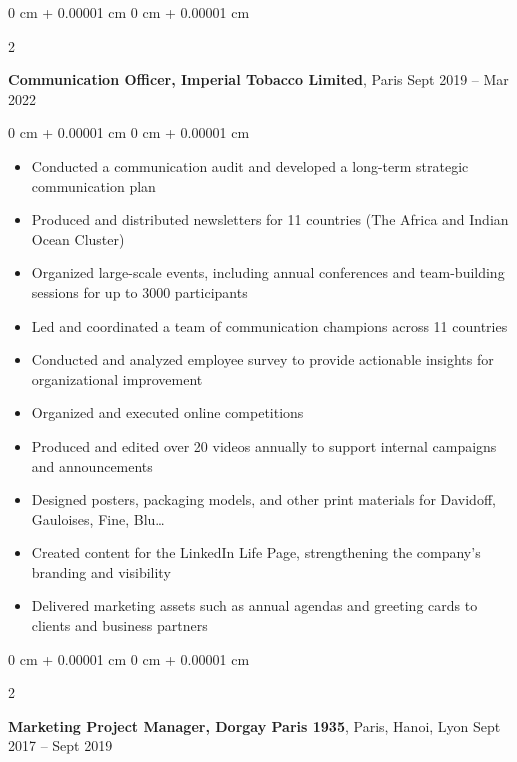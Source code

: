 \documentclass[10pt, letterpaper]{article}
\newenvironment{highlights}{
    \begin{itemize}[
        topsep=0.10 cm,
        parsep=0.10 cm,
        partopsep=0pt,
        itemsep=0pt,
        leftmargin=0 cm + 10pt
    ]
}{
    \end{itemize}
} %
\newenvironment{onecolentry}{
    \begin{adjustwidth}{
        0 cm + 0.00001 cm
    }{
        0 cm + 0.00001 cm
    }
}{
    \end{adjustwidth}
} %
\newenvironment{twocolentry}[2][]{
    \onecolentry
    \def\secondColumn{#2}
    \setcolumnwidth{\fill, 3.5 cm}
    \begin{paracol}{2}
}{
    \switchcolumn \raggedleft \secondColumn
    \end{paracol}
    \endonecolentry
} %
\begin{document}
        \vspace{0.2 cm}


        \begin{twocolentry}{
            Sept 2019 – Mar 2022
        }
            \textbf{Communication Officer, Imperial Tobacco Limited}, Paris\end{twocolentry}

        \vspace{0.10 cm}
        \begin{onecolentry}
            \begin{highlights}
\item Conducted a communication audit and developed a long-term strategic communication plan
\item Produced and distributed newsletters for 11 countries (The Africa and Indian Ocean Cluster)
\item Organized large-scale events, including annual conferences and team-building sessions for up to 3000 participants
\item Led and coordinated a team of communication champions across 11 countries
\item Conducted and analyzed employee survey to provide actionable insights for organizational improvement
\item Organized and executed online competitions
\item Produced and edited over 20 videos annually to support internal campaigns and announcements
\item Designed posters, packaging models, and other print materials for Davidoff, Gauloises, Fine, Blu…
\item Created content for the LinkedIn Life Page, strengthening the company’s branding and visibility
\item Delivered marketing assets such as annual agendas and greeting cards to clients and business partners
      
            \end{highlights}
        \end{onecolentry}



        \vspace{0.2 cm}


        \begin{twocolentry}{
            Sept 2017 – Sept 2019
        }
            \textbf{Marketing Project Manager, Dorgay Paris 1935}, Paris, Hanoi, Lyon\end{twocolentry}
\end{document}
